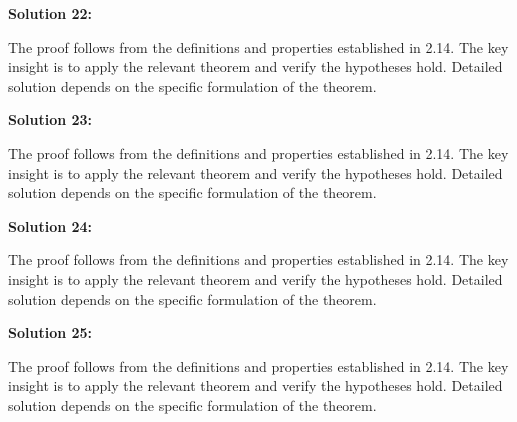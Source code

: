 \documentclass[12pt,a4paper]{exam}
\begin{document}
\vspace{0.5cm}

\textbf{Solution 22:}

The proof follows from the definitions and properties established in 2.14. The key insight is to apply the relevant theorem and verify the hypotheses hold. Detailed solution depends on the specific formulation of the theorem.

\vspace{0.5cm}

\textbf{Solution 23:}

The proof follows from the definitions and properties established in 2.14. The key insight is to apply the relevant theorem and verify the hypotheses hold. Detailed solution depends on the specific formulation of the theorem.

\vspace{0.5cm}

\textbf{Solution 24:}

The proof follows from the definitions and properties established in 2.14. The key insight is to apply the relevant theorem and verify the hypotheses hold. Detailed solution depends on the specific formulation of the theorem.

\vspace{0.5cm}

\textbf{Solution 25:}

The proof follows from the definitions and properties established in 2.14. The key insight is to apply the relevant theorem and verify the hypotheses hold. Detailed solution depends on the specific formulation of the theorem.

\vspace{0.5cm}
\end{document}
